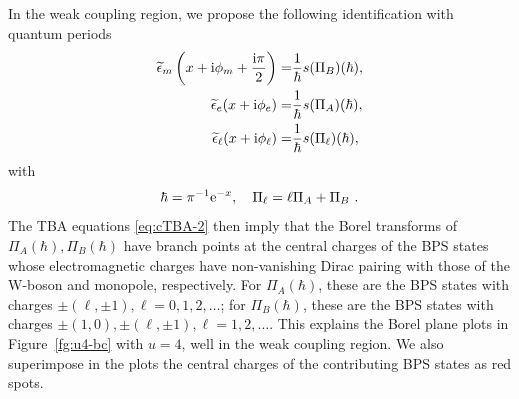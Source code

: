 \documentclass[a4paper,11pt]{article}
\theoremstyle{definition}
\newcommand{\re}{{\rm e}}
\newcommand{\ri}{{\rm i}}
\begin{document}
In the weak coupling region, we propose the following
identification with quantum periods
%
\begin{equation}\label{eq:TBA-dict-2}
  \begin{aligned}
    \widetilde \epsilon_m\left(x+\ri\phi_m+\frac{\ri\pi}{2}\right) =
    &\frac{1}{\hbar}s(\Pi_B)(\hbar),\\
    \widetilde \epsilon_e(x+\ri\phi_e) =
    &\frac{1}{\hbar}s(\Pi_A)(\hbar),\\
    \widetilde \epsilon_\ell(x+\ri\phi_\ell) =
    &\frac{1}{\hbar}s(\Pi_\ell)(\hbar),
  \end{aligned}
\end{equation}
%
with 
%
\begin{equation}
  \hbar = \pi^{-1}\re^{-x} , \quad \Pi_{\ell}=\ell \Pi_A+ \Pi_B \ .
\end{equation}
%
The TBA equations \eqref{eq:cTBA-2} then imply that the Borel
transforms of $\Pi_A(\hbar), \Pi_B(\hbar)$ have branch points at the
central charges of the BPS states whose electromagnetic charges have
non-vanishing Dirac pairing with those of the W-boson and monopole,
respectively. For $\Pi_A(\hbar)$, these are the BPS states with
charges $\pm(\ell,\pm 1), \ell=0,1,2,\ldots$; for $\Pi_B(\hbar)$,
these are the BPS states with charges
$\pm(1,0), \pm(\ell,\pm 1), \ell=1,2,\ldots$. This explains the Borel
plane plots in Figure~\ref{fg:u4-bc} with $u=4$, well in the weak
coupling region. We also superimpose in the plots the central charges
of the contributing BPS states as red spots.
\end{document}

